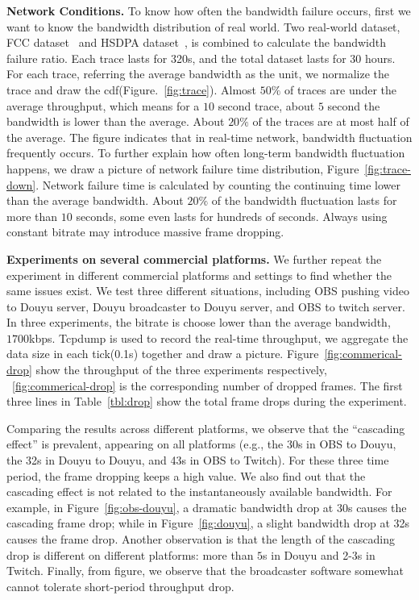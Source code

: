
\textbf{Network Conditions.} To know how often the bandwidth failure occurs, first we want to know the bandwidth distribution of real world. Two real-world dataset, FCC dataset~\cite{FCC_dataset} and HSDPA dataset~\cite{HSDPA_dataset}, is combined to calculate the bandwidth failure ratio. Each trace lasts for 320s, and the total dataset lasts for $30$ hours. For each trace, referring the average bandwidth as the unit, we normalize the trace and draw the cdf(Figure.~\ref{fig:trace}). Almost $50\%$ of traces are under the average throughput, which means for a $10$ second trace, about $5$ second the bandwidth is lower than the average. About $20\%$ of the traces are at most half of the average. The figure indicates that in real-time network, bandwidth fluctuation frequently occurs. To further explain how often long-term bandwidth fluctuation happens, we draw a picture of network failure time distribution, Figure~\ref{fig:trace-down}. Network failure time is calculated by counting the continuing time lower than the average bandwidth. About $20\%$ of the bandwidth fluctuation lasts for more than $10$ seconds, some even lasts for hundreds of seconds. Always using constant bitrate may introduce massive frame dropping.


\textbf{Experiments on several commercial platforms.} We further repeat the experiment in different commercial platforms and settings to find whether the same issues exist. We test three different situations, including OBS pushing video to Douyu server, Douyu broadcaster to Douyu server, and OBS to twitch server. In three experiments, the bitrate is choose lower than the average bandwidth, $1700$kbps. Tcpdump is used to record the real-time throughput, we aggregate the data size in each tick(0.1s) together and draw a picture.
Figure~\ref{fig:commerical-drop} show the throughput of the three experiments respectively, ~\ref{fig:commerical-drop} is the corresponding number of dropped frames. The first three lines in Table~\ref{tbl:drop} show the total frame drops during the experiment.

Comparing the results across different platforms, we observe that the ``cascading effect'' is prevalent, appearing on all platforms (e.g., the 30s in OBS to Douyu, the 32s in Douyu to Douyu, and 43s in OBS to Twitch). For these three time period, the frame dropping keeps a high value. We also find out that the cascading effect is not related to the instantaneously available bandwidth. For example, in Figure~\ref{fig:obs-douyu}, a dramatic bandwidth drop at 30s causes the cascading frame drop; while in Figure~\ref{fig:douyu}, a slight bandwidth drop at 32s causes the frame drop. Another observation is that the length of the cascading drop is different on different platforms: more than $5$s in Douyu and 2-3s in Twitch. Finally, from figure, we observe that the broadcaster software somewhat cannot tolerate short-period throughput drop.

